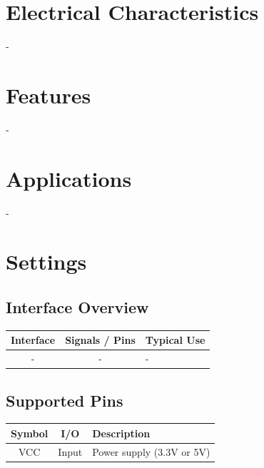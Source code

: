 \documentclass[10pt]{article}
\begin{document}
\section*{Electrical Characteristics}
-\\ 

\section*{Features}
-\\ 



\section*{Applications}
-\\ 

\vspace{1em}



\section*{Settings}

\subsection*{Interface Overview}
\begin{tabularx}{\textwidth}{|c|c|>{\RaggedRight\arraybackslash}X|}
\hline
\rowcolor{headergray}
Interface & Signals / Pins & Typical Use \\
\hline
- & - & - \\
\hline
\end{tabularx}


\subsection*{Supported Pins}
\begin{tabularx}{\textwidth}{|c|c|>{\RaggedRight\arraybackslash}X|}
\hline
\rowcolor{headergray}
Symbol & I/O & Description \\
\hline
VCC & Input & Power supply (3.3V or 5V) \\
\hline
\end{tabularx}






\end{document}

